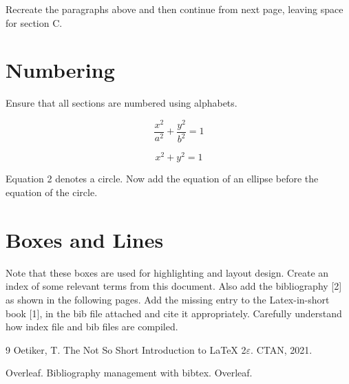\documentclass{article}
\begin{document}
Recreate the paragraphs above and then continue from next page, leaving space for section C.

\newpage


\section{Numbering}

Ensure that all sections are numbered using alphabets.

\begin{equation}
\frac{x^2}{a^2} + \frac{y^2}{b^2} = 1
\end{equation}

\begin{equation}
x^2 + y^2 = 1
\end{equation}

Equation 2 denotes a circle. Now add the equation of an ellipse before the equation of the circle.

\section{Boxes and Lines}

\noindent \usebox{\mybox} \par
\vspace{2pt}
\noindent \usebox{\mybox} \par
\vspace{2pt}
\noindent \usebox{\mybox}

\vspace{0.5cm}
\noindent {}

\vspace{0.5cm}
\noindent Note that these boxes are used for highlighting and layout design. Create an index of some relevant terms from this document. Also add the bibliography [2] as shown in the following pages. Add the missing entry to the Latex-in-short book [1], in the bib file attached and cite it appropriately. Carefully understand how index file and bib files are compiled.

\newpage
\printindex

\newpage
\begin{thebibliography}{9}
Oetiker, T. The Not So Short Introduction to \LaTeX{} 2$\varepsilon$. CTAN, 2021.

Overleaf. Bibliography management with bibtex. Overleaf.
\end{thebibliography}
\end{document}
